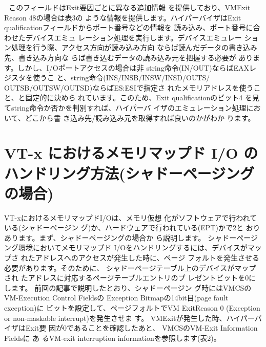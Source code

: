 
 
 このフィールドはExit要因ごとに異なる追加情報
を提供しており、VMExit Reason 48の場合は表3の
ような情報を提供します。ハイパーバイザはExit
qualificationフィールドからポート番号などの情報を
読み込み、ポート番号に合わせたデバイスエミュ
レーション処理を実行します。デバイスエミュレー
ション処理を行う際、アクセス方向が読み込み方向
ならば読んだデータの書き込み先、書き込み方向な
らば書き込むデータの読み込み元を把握する必要が
あります。しかし、I/Oポートアクセスの場合は非
string命令(IN/OUT)ならばEAXレジスタを使うこ
と、string命令(INS/INSB/INSW/INSD/OUTS/
OUTSB/OUTSW/OUTSD)ならばES:ESIで指定さ
れたメモリアドレスを使うこと、と固定的に決めら
れています。このため、Exit qualificationのビット4
を見てstring命令か否かを判別すれば、ハイパーバ
イザのエミュレーション処理において、どこから書
き込み先/読み込み元を取得すれば良いのかがわか
ります。


\section{VT-x におけるメモリマップド I/O のハンドリング方法(シャドーページングの場合)}

 VT-xにおけるメモリマップドI/Oは、メモリ仮想
化がソフトウェアで行われている(シャドーページン
グ)か、ハードウェアで行われている(EPT)かで2と
おりあります。まず、シャドーページングの場合か
ら説明します。
 シャドーページング環境においてメモリマップド
I/Oをハンドリングするには、デバイスがマップさ
れたアドレスへのアクセスが発生した時に、ページ
フォルトを発生させる必要があります。そのために、
シャドーページテーブル上のデバイスがマップされ
たアドレスに対応するページテーブルエントリのプ
レゼントビットを0にします。
 前回の記事で説明したとおり、シャドーページン
グ時にはVMCSのVM-Execution Control Fieldsの
Exception Bitmapの14bit目(page fault exception)に
ビットを設定して、ページフォルトでVM ExitReason
0 (Exception or non-maskable interrupt)を発生させま
す。 VMExitが発生した時、ハイパーバイザはExit要
因が0であることを確認したあと、 VMCSのVM-Exit
Information Fieldsに あ るVM-exit interruption
informationを参照します(表2)。


